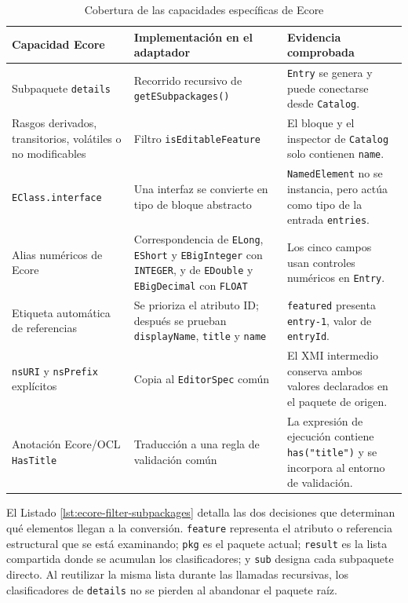 \begin{table}[H]
  \centering
  \scriptsize
  \begin{tabular}{|L{0.25\textwidth}|L{0.29\textwidth}|L{0.33\textwidth}|}
    \hline
    Capacidad Ecore & Implementación en el adaptador & Evidencia comprobada \\
    \hline
    Subpaquete \texttt{details} & Recorrido recursivo de
    \texttt{getESubpackages()} & \texttt{Entry} se genera y puede conectarse
    desde \texttt{Catalog}. \\
    \hline
    Rasgos derivados, transitorios, volátiles o no modificables & Filtro
    \texttt{isEditableFeature} & El bloque y el inspector de \texttt{Catalog}
    solo contienen \texttt{name}. \\
    \hline
    \texttt{EClass.interface} & Una interfaz se convierte en tipo de bloque
    abstracto & \texttt{NamedElement} no se instancia, pero actúa como tipo de
    la entrada \texttt{entries}. \\
    \hline
    Alias numéricos de Ecore & Correspondencia de \texttt{ELong},
    \texttt{EShort} y \texttt{EBigInteger} con \texttt{INTEGER}, y de
    \texttt{EDouble} y \texttt{EBigDecimal} con \texttt{FLOAT} & Los cinco
    campos usan controles numéricos en \texttt{Entry}. \\
    \hline
    Etiqueta automática de referencias & Se prioriza el atributo ID; después
    se prueban \texttt{displayName}, \texttt{title} y \texttt{name} &
    \texttt{featured} presenta \texttt{entry-1}, valor de \texttt{entryId}. \\
    \hline
    \texttt{nsURI} y \texttt{nsPrefix} explícitos & Copia al
    \texttt{EditorSpec} común & El XMI intermedio conserva ambos valores
    declarados en el paquete de origen. \\
    \hline
    Anotación Ecore/OCL \texttt{HasTitle} & Traducción a una regla de
    validación común & La expresión de ejecución contiene
    \texttt{has("title")} y se incorpora al entorno de validación. \\
    \hline
  \end{tabular}
  \caption{Cobertura de las capacidades específicas de Ecore}
  \label{tab:ecore-specific-capabilities}
\end{table}

El Listado \ref{lst:ecore-filter-subpackages} detalla las dos decisiones que
determinan qué elementos llegan a la conversión. \texttt{feature} representa
el atributo o referencia estructural que se está examinando; \texttt{pkg} es
el paquete actual; \texttt{result} es la lista compartida donde se acumulan
los clasificadores; y \texttt{sub} designa cada subpaquete directo. Al
reutilizar la misma lista durante las llamadas recursivas, los clasificadores
de \texttt{details} no se pierden al abandonar el paquete raíz.

